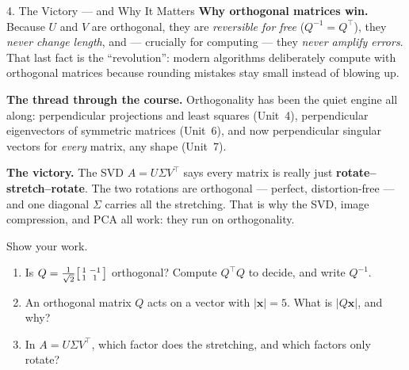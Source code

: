 \documentclass[10pt]{article}
\newcommand{\xx}{\mathbf{x}}
\newcommand{\T}{^{\top}}
\begin{document}
\begin{notesbox}{4. The Victory --- and Why It Matters}
\textbf{Why orthogonal matrices win.} Because $U$ and $V$ are orthogonal, they are \emph{reversible for free}
($Q^{-1}=Q\T$), they \emph{never change length}, and --- crucially for computing --- they \emph{never amplify
errors}. That last fact is the ``revolution'': modern algorithms deliberately compute with orthogonal matrices
because rounding mistakes stay small instead of blowing up.

\vspace{2pt}
\textbf{The thread through the course.} Orthogonality has been the quiet engine all along: perpendicular
projections and least squares (Unit~4), perpendicular eigenvectors of symmetric matrices (Unit~6), and now
perpendicular singular vectors for \emph{every} matrix, any shape (Unit~7).

\vspace{2pt}
\textbf{The victory.} The SVD $A=U\Sigma V\T$ says every matrix is really just \textbf{rotate--stretch--rotate}.
The two rotations are orthogonal --- perfect, distortion-free --- and one diagonal $\Sigma$ carries all the
stretching. That is why the SVD, image compression, and PCA all work: they run on orthogonality.
\end{notesbox}

\begin{practicebox}
Show your work.
\begin{enumerate}[leftmargin=1.6em, itemsep=4pt]
  \item Is $Q=\tfrac1{\sqrt2}\begin{bsmallmatrix} 1 & -1\\ 1 & 1 \end{bsmallmatrix}$ orthogonal? Compute $Q\T Q$ to decide, and write $Q^{-1}$. \writeline
  \item An orthogonal matrix $Q$ acts on a vector with $|\xx|=5$. What is $|Q\xx|$, and why? \writeline
  \item In $A=U\Sigma V\T$, which factor does the stretching, and which factors only rotate? \writeline
\end{enumerate}
\end{practicebox}
\end{document}
